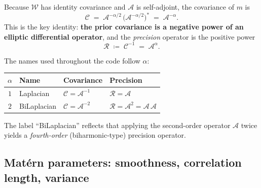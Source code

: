 \documentclass[11pt]{article}
\theoremstyle{definition}
\theoremstyle{plain}
\theoremstyle{remark}
\newcommand{\Cc}{\mathcal{C}}
\newcommand{\Ac}{\mathcal{A}}
\newcommand{\Rc}{\mathcal{R}}
\newcommand{\Wc}{\mathcal{W}}
\begin{document}
Because $\Wc$ has identity covariance and $\Ac$ is self-adjoint, the covariance
of $m$ is
\begin{equation}
  \Cc \;=\; \Ac^{-\alpha/2}\,\bigl(\Ac^{-\alpha/2}\bigr)^{*}
       \;=\; \Ac^{-\alpha}.
  \label{eq:covariance}
\end{equation}
This is the key identity: \textbf{the prior covariance is a negative power of
an elliptic differential operator}, and the \emph{precision} operator is the
positive power
\begin{equation}
  \Rc \;\coloneqq\; \Cc^{-1} \;=\; \Ac^{\alpha}.
\end{equation}

The names used throughout the code follow $\alpha$:
\begin{center}
\begin{tabular}{clll}
\toprule
$\alpha$ & Name & Covariance & Precision \\
\midrule
$1$ & Laplacian   & $\Cc = \Ac^{-1}$  & $\Rc = \Ac$ \\
$2$ & BiLaplacian & $\Cc = \Ac^{-2}$  & $\Rc = \Ac^2 = \Ac\,\Ac$ \\
\bottomrule
\end{tabular}
\end{center}
The label ``BiLaplacian'' reflects that applying the second-order operator
$\Ac$ twice yields a \emph{fourth-order} (biharmonic-type) precision operator.

\subsection{Mat\'ern parameters: smoothness, correlation length, variance}
\end{document}
